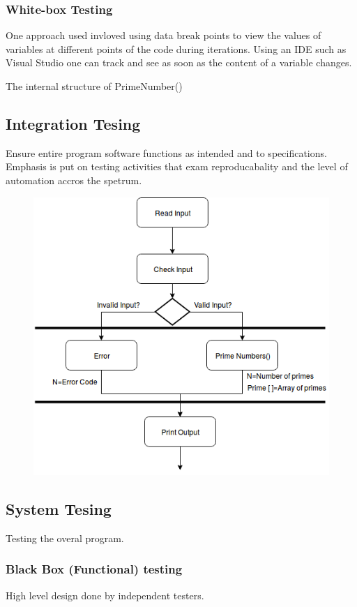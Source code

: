 \documentclass[11 pt]{article}
\begin{document}
\subsubsection{White-box Testing}
One approach used invloved using data break points to view the values of variables at different points of the code during iterations. Using an IDE such as Visual Studio one can track and see as soon as the content of a variable changes.

The internal structure of PrimeNumber()

\subsection{Integration Tesing}
Ensure entire program software functions as intended and to specifications. Emphasis is put on testing activities that exam reproducabality and the level of automation accros the spetrum.
 \begin{figure}[h]
    \centering
    
    \includegraphics[width=\linewidth]{Integration Testing.png}
    \end{figure}
\subsection{System Tesing}
Testing the overal program.
\subsubsection{Black Box (Functional) testing}
High level design done by independent testers.\\
\end{document}
